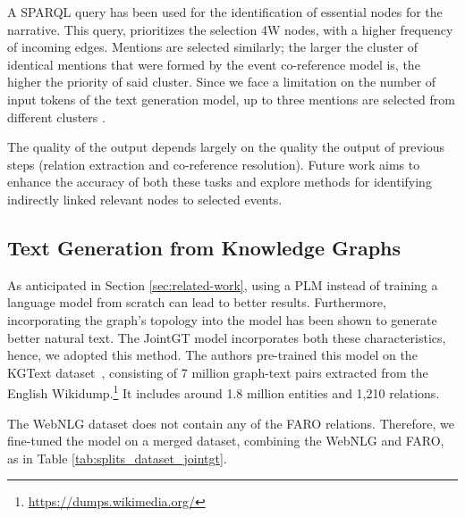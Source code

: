 \documentclass[
hf, %
]{ceurart}
\begin{document}

A SPARQL query has been used for the identification of essential nodes for the narrative. This query, prioritizes the selection 4W nodes, with a higher frequency of incoming edges. Mentions are selected similarly; the larger the cluster of identical mentions that were formed by the event co-reference model is, the higher the priority of said cluster. Since we face a limitation on the number of input tokens of the text generation model, up to three mentions are selected from different clusters .

The quality of the output depends largely on the quality the output of previous steps (relation extraction and co-reference resolution). Future work aims to enhance the accuracy of both these tasks and explore methods for identifying indirectly linked relevant nodes to selected events.


\subsection{Text Generation from Knowledge Graphs}
As anticipated in Section \ref{sec:related-work}, using a PLM instead of training a language model from scratch can lead to better results. Furthermore, incorporating the graph's topology into the model has been shown to generate better natural text. The JointGT model \cite{JointGT} incorporates both these characteristics, hence, we adopted this method. The authors pre-trained this model on the KGText dataset~\cite{KGtext}, consisting of 7 million graph-text pairs extracted from the English Wikidump.\footnote{\url{https://dumps.wikimedia.org/}} It includes around 1.8 million entities and 1,210 relations.

The WebNLG dataset does not contain any of the FARO relations. Therefore, we fine-tuned the model on a merged dataset, combining the WebNLG and FARO, as in Table \ref{tab:splits_dataset_jointgt}.
\end{document}

